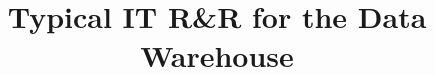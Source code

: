 \documentclass{vldb}
\begin{document}


\title{Typical IT R\&R for the Data Warehouse}



%
%
%
%

\end{document}

